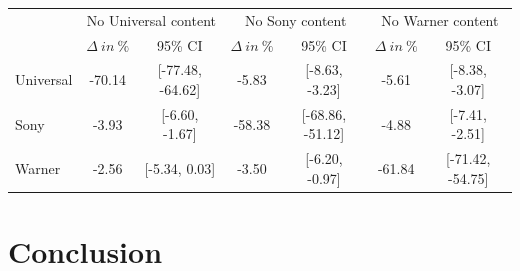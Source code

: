 \documentclass[8pt]{beamer}
\begin{document}
{\begin{itemize}
\begin{table}[H]
\centering
\begingroup\fontsize{6pt}{7pt}\selectfont
\begin{tabular}{lcccccc}
  \hline \hline
   & \multicolumn{2}{c}{No Universal content} & \multicolumn{2}{c}{No Sony content} & \multicolumn{2}{c}{No Warner content} \\ & $\Delta\ in\ \%$ & 95\% CI & $\Delta\ in\ \%$ & 95\% CI & $\Delta\ in\ \%$ & 95\% CI\\ \hline
Universal & -70.14 & [-77.48, -64.62] & -5.83 & [-8.63, -3.23] & -5.61 & [-8.38, -3.07] \\ 
  Sony & -3.93 & [-6.60, -1.67] & -58.38 & [-68.86, -51.12] & -4.88 & [-7.41, -2.51] \\ 
  Warner & -2.56 & [-5.34, 0.03] & -3.50 & [-6.20, -0.97] & -61.84 & [-71.42, -54.75] \\ 
   \hline \hline
\end{tabular}
\endgroup
\label{rev_labels_featured}
\end{table}


\end{itemize}

		
}




\section{Conclusion}
\end{document}
